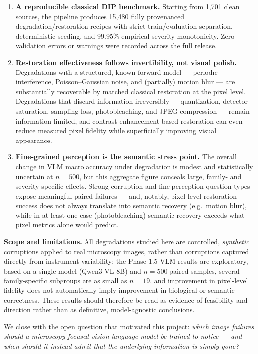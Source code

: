 \documentclass[11pt]{article}
\begin{document}
\begin{enumerate}[leftmargin=1.6em]
    \item \textbf{A reproducible classical DIP benchmark.} Starting from 1{,}701 clean
    sources, the pipeline produces 15{,}480 fully provenanced degradation/restoration
    recipes with strict train/evaluation separation, deterministic seeding, and 99.95\%
    empirical severity monotonicity. Zero validation errors or warnings were recorded
    across the full release.
    \item \textbf{Restoration effectiveness follows invertibility, not visual polish.}
    Degradations with a structured, known forward model --- periodic interference,
    Poisson--Gaussian noise, and (partially) motion blur --- are substantially
    recoverable by matched classical restoration at the pixel level. Degradations that
    discard information irreversibly --- quantization, detector saturation, sampling
    loss, photobleaching, and JPEG compression --- remain information-limited, and
    contrast-enhancement-based restoration can even reduce measured pixel fidelity
    while superficially improving visual appearance.
    \item \textbf{Fine-grained perception is the semantic stress point.} The overall
    change in VLM macro accuracy under degradation is modest and statistically
    uncertain at $n=500$, but this aggregate figure conceals large, family- and
    severity-specific effects. Strong corruption and fine-perception question types
    expose meaningful paired failures --- and, notably, pixel-level restoration success
    does not always translate into semantic recovery (e.g.\ motion blur), while in at
    least one case (photobleaching) semantic recovery exceeds what pixel metrics alone
    would predict.
\end{enumerate}

\textbf{Scope and limitations.} All degradations studied here are controlled,
\emph{synthetic} corruptions applied to real microscopy images, rather than corruptions
captured directly from instrument variability; the Phase 1.5 VLM results are exploratory,
based on a single model (Qwen3-VL-8B) and $n=500$ paired samples, several
family-specific subgroups are as small as $n=19$, and improvement in pixel-level fidelity
does not automatically imply improvement in biological or semantic correctness. These
results should therefore be read as evidence of feasibility and direction rather than as
definitive, model-agnostic conclusions.

We close with the open question that motivated this project: \emph{which image
failures should a microscopy-focused vision-language model be trained to notice --- and
when should it instead admit that the underlying information is simply gone?}
\end{document}
